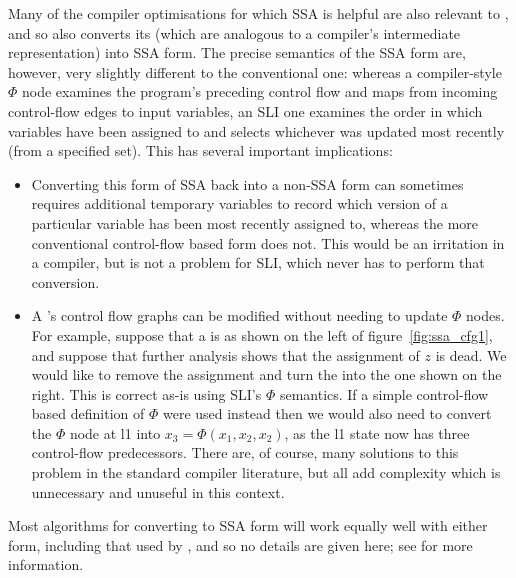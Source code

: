 Many of the compiler optimisations for which SSA is helpful are also
relevant to {\technique}, and so {\technique} also converts its
{\StateMachines} (which are analogous to a compiler's intermediate
representation) into SSA form.  The precise semantics of the SSA form
are, however, very slightly different to the conventional one: whereas
a compiler-style $\Phi$ node examines the program's preceding control
flow and maps from incoming control-flow edges to input variables, an
SLI one examines the order in which variables have been assigned to
and selects whichever was updated most recently (from a specified
set).  This has several important implications:

\begin{itemize}
\item
  Converting this form of SSA back into a non-SSA form can sometimes
  requires additional temporary variables to record which version of a
  particular variable has been most recently assigned to, whereas the
  more conventional control-flow based form does not.  This would be
  an irritation in a compiler, but is not a problem for SLI, which
  never has to perform that conversion.
\item
  A {\StateMachine}'s control flow graphs can be modified without
  needing to update $\Phi$ nodes.  For example, suppose that a
  {\StateMachine} is as shown on the left of
  figure~\ref{fig:ssa_cfg1}, and suppose that further analysis shows
  that the assignment of $z$ is dead.  We would like to remove the
  assignment and turn the {\StateMachine} into the one shown on the
  right.  This is correct as-is using SLI's $\Phi$ semantics.  If a
  simple control-flow based definition of $\Phi$ were used instead
  then we would also need to convert the $\Phi$ node at l1 into $x_3 =
  \Phi(x_1, x_2, x_2)$, as the l1 state now has three control-flow
  predecessors.  There are, of course, many solutions to this problem
  in the standard compiler literature\needCite{}, but all add
  complexity which is unnecessary and unuseful in this context.
\end{itemize}

Most algorithms for converting to SSA form will work equally well with
either form, including that used by \implementation, and so no details
are given here; see \needCite{} for more information.


